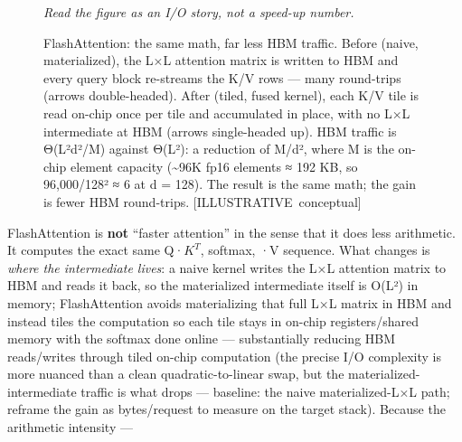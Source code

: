 \begin{figure}
\centering
{}
\caption[FlashAttention: the same math, far less HBM traffic]{FlashAttention: the same math, far less HBM traffic. Before (naive, materialized), the L×L attention matrix is written to HBM and every query block re-streams the K/V rows --- many round-trips (arrows double-headed). After (tiled, fused kernel), each K/V tile is read on-chip once per tile and accumulated in place, with no L×L intermediate at HBM (arrows single-headed up). HBM traffic is Θ(L²d²/M) against Θ(L²): a reduction of M/d², where M is the on-chip element capacity (\textasciitilde96K fp16 elements ≈ 192 KB, so 96,000/128² ≈ 6 at d = 128). The result is the same math; the gain is fewer HBM round-trips. \mbox{{[}ILLUSTRATIVE conceptual{]}}}

\label{fig:15.1}\emph{Read the figure as an I/O story, not a speed-up number.}

\end{figure}FlashAttention is \textbf{not} ``faster attention'' in the sense that it
does less arithmetic. It computes the exact same Q·\(K^{T}\), softmax,
·V sequence. What changes is \emph{where the intermediate lives}: a
naive kernel writes the L×L attention matrix to HBM and reads it back,
so the materialized intermediate itself is O(L²) in memory;
FlashAttention avoids materializing that full L×L matrix in HBM and
instead tiles the computation so each tile stays in on-chip
registers/shared memory with the softmax done online --- substantially
reducing HBM reads/writes through tiled on-chip computation (the precise
I/O complexity is more nuanced than a clean quadratic-to-linear swap,
but the materialized-intermediate traffic is what drops --- baseline:
the naive materialized-L×L path; reframe the gain as bytes/request to
measure on the target stack). Because the arithmetic intensity ---
